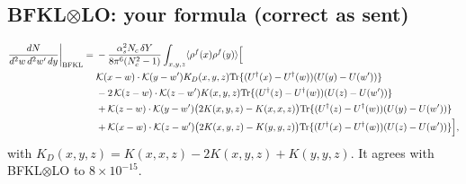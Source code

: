 \documentclass[10pt]{article}
\numberwithin{equation}{section}
\begin{document}
\subsection{BFKL$\otimes$LO: your formula (correct as sent)}
\begin{align}
\frac{dN}{d^2w\,d^2w'\,dy}\bigg|_{\rm BFKL}={}&-\frac{\alpha_s^2N_c\,\delta Y}{8\pi^6(N_c^2-1)}\int_{x,y,z}\langle\rho^f(x)\rho^f(y)\rangle\Big[\notag\\
&\mathcal K(x-w)\cdot\mathcal K(y-w')K_D(x,y,z){\rm Tr}\{(U^\dagger(x)-U^\dagger(w))(U(y)-U(w'))\}\notag\\
&-2\,\mathcal K(z-w)\cdot\mathcal K(z-w')K(x,y,z){\rm Tr}\{(U^\dagger(z)-U^\dagger(w))(U(z)-U(w'))\}\notag\\
&+\mathcal K(z-w)\cdot\mathcal K(y-w')\big(2K(x,y,z)-K(x,x,z)\big){\rm Tr}\{(U^\dagger(z)-U^\dagger(w))(U(y)-U(w'))\}\notag\\
&+\mathcal K(x-w)\cdot\mathcal K(z-w')\big(2K(x,y,z)-K(y,y,z)\big){\rm Tr}\{(U^\dagger(x)-U^\dagger(w))(U(z)-U(w'))\}\Big],
\label{eq:BFKL}
\end{align}
with $K_D(x,y,z)=K(x,x,z)-2K(x,y,z)+K(y,y,z)$. It agrees with BFKL$\otimes$LO to $8\times10^{-15}$.

\end{document}
